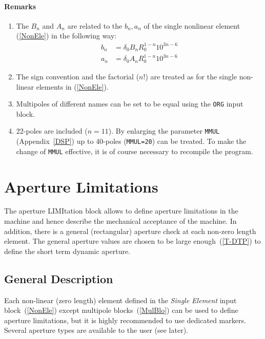 \paragraph{Remarks}
\begin{enumerate}
    \item The $B_{n}$ and $A_{n}$ are related to the $b_{n}, a_{n}$ of the single nonlinear element (\ref{NonEle}) in the following way:
        \begin{align*}
            b_{n} &= \delta_{0} B_{n} R_{0}^{1-n} 10^{3n-6} \\
            a_{n} &= \delta_{0} A_{n} R_{0}^{1-n} 10^{3n-6}
        \end{align*}
    \item The sign convention and the factorial ($n$!) are treated as for the single non-linear elements in (\ref{NonEle}).
    \item Multipoles of different names can be set to be equal using the \texttt{ORG} input block.
    \item 22-poles are included ($n=11$). By enlarging the parameter \texttt{MMUL} (Appendix~\ref{DSP}) up to 40-poles (\texttt{MMUL=20}) can be treated. To make the change of \texttt{MMUL} effective, it is of course necessary to recompile the program.
\end{enumerate}

\section{Aperture Limitations} \label{ApeLim}

The aperture LIMItation block allows to define aperture limitations in the machine and hence describe the mechanical acceptance of the machine.
In addition, there is a general (rectangular) aperture check at each non-zero length element. The general aperture values are chosen to be large enough~(\ref{T-DTP}) to define the short term dynamic aperture.

\subsection{General Description} \label{ApeLim:GenDesc}
Each non-linear (zero length) element defined in the \textit{Single Element} input block~(\ref{NonEle}) except multipole blocks~(\ref{MulBlo}) can be used to define aperture limitations, but it is highly recommended to use dedicated markers.
Several aperture types are available to the user (see later).

